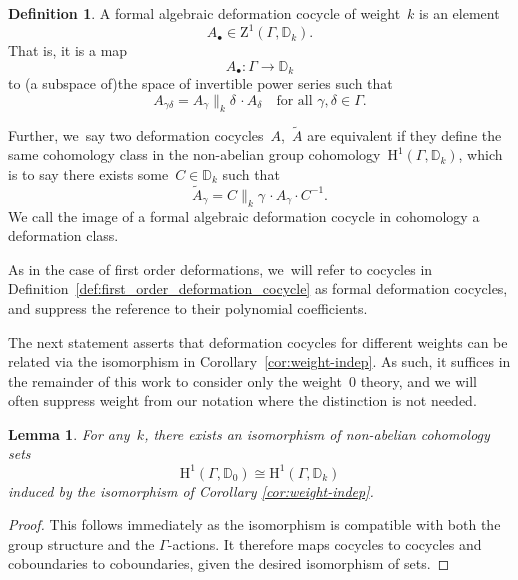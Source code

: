 \documentclass[JEP,XML,SOM,Unicode,published]{cedram}
\let\oldbullet\bullet
\renewcommand{\bullet}{{\scriptscriptstyle\oldbullet}}
\theoremstyle{plain}
\newtheorem{lemma}[theoremcounter]{Lemma}
\theoremstyle{definition}
\newtheorem{definition}[theoremcounter]{Definition}
\newcommand{\tx}{\text}
\newcommand{\bbD}{\ensuremath{\mathbb{D}}}
\newcommand{\rmH}{\ensuremath{\mathrm{H}}}
\newcommand{\rmZ}{\ensuremath{\mathrm{Z}}}
\let\wtd\widetilde
\newcommand{\defcol}{\mathrel{:}}
\let\Ga\Gamma
\let\ga\gamma
\begin{document}
\begin{definition}
\label{def:algebraic_deformation_cocycle}
A formal algebraic deformation cocycle of weight~$k$ is an element
\begin{equation*}
A_\bullet \in \rmZ^1(\Ga,\bbD_k)
\tx{.}
\end{equation*}
That is, it is a map
\begin{equation*}
A_\bullet \defcol \Ga \to \bbD_k
\end{equation*}
to (a subspace of)the space of invertible power series such that
\begin{equation*}
A_{\ga\delta} = A_\ga\big\|_k \delta\,\cdot A_\delta
\quad
\tx{for all\ }\ga, \delta \in \Ga
\tx{.}
\end{equation*}

Further, we~say two deformation cocycles~$A$,~$\wtd{A}$ are equivalent if they define the same cohomology class in the non-abelian group cohomology~$\rmH^1(\Ga,\bbD_k)$, which is to say there exists some~$C\in\bbD_k$ such that
\begin{equation*}
\wtd{A}_\ga = C\big\|_k\ga\,\cdot A_\ga\cdot C^{-1}
\tx{.}
\end{equation*}
We call the image of a formal algebraic deformation cocycle in cohomology a deformation class.
\end{definition}

As in the case of first order deformations, we~will refer to cocycles in Definition~\ref{def:first_order_deformation_cocycle} as formal deformation cocycles, and suppress the reference to their polynomial coefficients.

The next statement asserts that deformation cocycles for different weights can be related via the isomorphism in Corollary~\ref{cor:weight-indep}. As such, it suffices in the remainder of this work to consider only the weight~$0$ theory, and we will often suppress weight from our notation where the distinction is not needed.

\begin{lemma}
\label{lem:weight-independence}
For any~$k$, there exists an isomorphism of non-abelian cohomology sets
\begin{equation*}
\rmH^1(\Ga,\bbD_0) \cong \rmH^1(\Ga,\bbD_k)
\end{equation*}
induced by the isomorphism of Corollary \ref{cor:weight-indep}.
\end{lemma}

\begin{proof}
This follows immediately as the isomorphism is compatible with both the group structure and the $\Ga$-actions. It therefore maps cocycles to cocycles and coboundaries to coboundaries, given the desired isomorphism of sets.
\end{proof}
\end{document}
